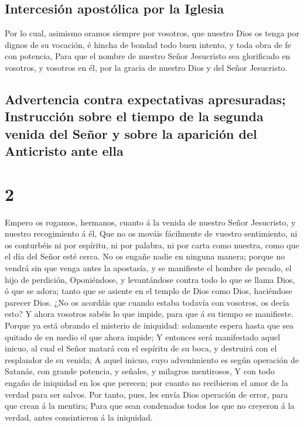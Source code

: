 \hypertarget{intercesiuxf3n-apostuxf3lica-por-la-iglesia}{%
\subsection{Intercesión apostólica por la
Iglesia}\label{intercesiuxf3n-apostuxf3lica-por-la-iglesia}}

 Por lo cual, asimismo oramos siempre por vosotros, que
nuestro Dios os tenga por dignos de su vocación, é hincha de bondad todo
buen intento, y toda obra de fe con potencia,  Para que
el nombre de nuestro Señor Jesucristo sea glorificado en vosotros, y
vosotros en él, por la gracia de nuestro Dios y del Señor Jesucristo.

\hypertarget{advertencia-contra-expectativas-apresuradas-instrucciuxf3n-sobre-el-tiempo-de-la-segunda-venida-del-seuxf1or-y-sobre-la-apariciuxf3n-del-anticristo-ante-ella}{%
\subsection{Advertencia contra expectativas apresuradas; Instrucción
sobre el tiempo de la segunda venida del Señor y sobre la aparición del
Anticristo ante
ella}\label{advertencia-contra-expectativas-apresuradas-instrucciuxf3n-sobre-el-tiempo-de-la-segunda-venida-del-seuxf1or-y-sobre-la-apariciuxf3n-del-anticristo-ante-ella}}

\hypertarget{section-53-2}{%
\section{2}\label{section-53-2}}

 Empero os rogamos, hermanos, cuanto á la venida de
nuestro Señor Jesucristo, y nuestro recogimiento á él, 
Que no os mováis fácilmente de vuestro sentimiento, ni os conturbéis ni
por espíritu, ni por palabra, ni por carta como nuestra, como que el día
del Señor esté cerca.  No os engañe nadie en ninguna
manera; porque no vendrá sin que venga antes la apostasía, y se
manifieste el hombre de pecado, el hijo de perdición, 
Oponiéndose, y levantándose contra todo lo que se llama Dios, ó que se
adora; tanto que se asiente en el templo de Dios como Dios, haciéndose
parecer Dios.  ¿No os acordáis que cuando estaba todavía
con vosotros, os decía esto?  Y ahora vosotros sabéis lo
que impide, para que á su tiempo se manifieste.  Porque ya
está obrando el misterio de iniquidad: solamente espera hasta que sea
quitado de en medio el que ahora impide;  Y entonces será
manifestado aquel inicuo, al cual el Señor matará con el espíritu de su
boca, y destruirá con el resplandor de su venida;  A aquel
inicuo, cuyo advenimiento es según operación de Satanás, con grande
potencia, y señales, y milagros mentirosos,  Y con todo
engaño de iniquidad en los que perecen; por cuanto no recibieron el amor
de la verdad para ser salvos.  Por tanto, pues, les envía
Dios operación de error, para que crean á la mentira; 
Para que sean condenados todos los que no creyeron á la verdad, antes
consintieron á la iniquidad.

